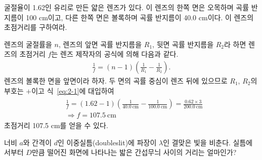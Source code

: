\documentclass[tightenlines,floatfix,nofootinbib,superscriptaddress,fleqn]{revtex4}
\begin{document}
굴절율이 1.62인 유리로 만든 얇은 렌즈가 있다. 이 렌즈의 한쪽 면은
오목하며 곡률 반지름이 100 cm이고, 다른 한쪽 면은 볼록하며
곡률 반지름이 40.0 cm이다. 이 렌즈의 초점거리를 구하여라. 

렌즈의 굴절률을 $n$, 렌즈의 앞면 곡률 반지름을 $R_1$, 뒷면 곡률 반지름을 $R_2$라
하면 렌즈의 초점거리 $f$는 렌즈 제작자의 공식에 의해 다음과 같다.
\begin{align}\label{eq:2-1}
  \frac{1}{f} = (n-1)\left(\frac{1}{R_1}-\frac{1}{R_2}\right).
\end{align}
렌즈의 볼록한 면을 앞면이라 하자. 두 면의 곡률 중심이 렌즈 뒤에 있으므로 
$R_1$, $R_2$의 부호는 $+$이고 식~\eqref{eq:2-1}에 대입하여
\begin{align}
  \begin{split}
    &\frac{1}{f}=(1.62-1)\left(\frac{1}{40.0~\mathrm{cm}}
    -\frac{1}{100.0~\mathrm{cm}}\right)
    =\frac{0.62\times3}{200.0~\mathrm{cm}}\\ &\Longrightarrow
    f=107.5~\mathrm{cm}
  \end{split}
\end{align}
초점거리 107.5 cm를 얻을 수 있다.


\vspace{1cm}

너비 $a$와 간격이 $d$인 이중실틈(doubleslit)에 파장이 $\lambda$인
결맞은 빛을 비춘다. 실틈에서부터 $D$만큼 떨어진 화면에 나타나는 밟은
간섭무늬 사이의 거리는 얼마인가?
\end{document}
